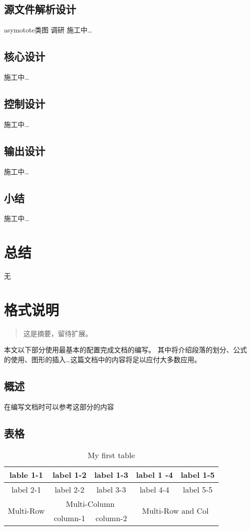 \documentclass[12pt,a4paper]{report}
\begin{document}
\section{源文件解析设计}
asymotote类图 调研
施工中\ldots
\section{核心设计}
施工中\ldots
\section{控制设计}
施工中\ldots
\section{输出设计}
施工中\ldots
\section{小结}
施工中\ldots
\newpage

\chapter{总结}
无
\newpage

\chapter{格式说明}

\begin{abstract}
这是摘要，留待扩展。
\end{abstract}

本文以下部分使用\LaTeXe{}最基本的配置完成文档的编写。 其中将介绍段落的划分、公式的使用、图形的插入\ldots 这篇文档中的内容将足以应付大多数应用。
\section{概述}
在编写文档时可以参考这部分的内容
\newpage

\section{表格}
\begin{table}[!hbp]
	\begin{tabular}{|c|c|c|c|c|}
		\hline
		\hline
		lable 1-1 & label 1-2 & label 1-3 & label 1 -4 & label 1-5 \\
		\hline
		label 2-1 & label 2-2 & label 3-3 & label 4-4 & label 5-5 \\
		\hline
		\multirow{2}{*}{Multi-Row} & \multicolumn{2}{|c|}{Multi-Column} & \multicolumn{2}{|c|}{\multirow{2}{*}{Multi-Row and Col}} \\
		\cline{2-3}
		& column-1 & column-2 & \multicolumn{2}{|c|}{}\\
		\hline
	\end{tabular}
	\caption{My first table}
\end{table} 
\newpage
\end{document}
